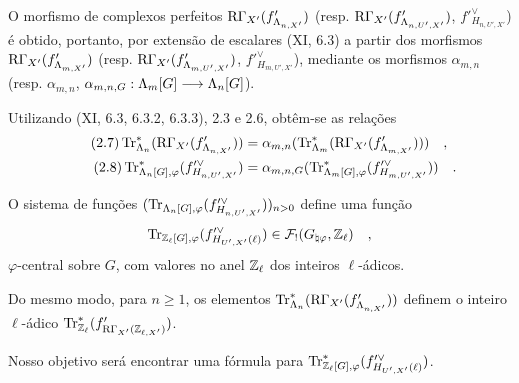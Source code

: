 O morfismo de complexos perfeitos $\mathrm{R}\Gamma_{X'}(f'_{\Lambda_{n,X'}})$ (resp. $\mathrm{R}\Gamma_{X'}(f'_{\Lambda_{n,U',X'}})$, $f'^\vee_{H_{n,U',X'}}$) é obtido, portanto, por extensão de escalares (XI, 6.3) a partir dos morfismos $\mathrm{R}\Gamma_{X'}(f'_{\Lambda_{m,X'}})$ (resp. $\mathrm{R}\Gamma_{X'}(f'_{\Lambda_{m,U',X'}})$, $f'^\vee_{H_{m,U',X'}}$), mediante os morfismos $\alpha_{m,n}$ (resp. $\alpha_{m,n}$, $\alpha_{m,n,G} : \Lambda_m[G] \longrightarrow \Lambda_n[G]$).

Utilizando (XI, 6.3, 6.3.2, 6.3.3), 2.3 e 2.6, obtêm-se as relações
\begin{align}
\tag{2.7} \operatorname{Tr}^*_{\Lambda_n}(\mathrm{R}\Gamma_{X'}(f'_{\Lambda_{n,X'}})) &= \alpha_{m,n}(\operatorname{Tr}^*_{\Lambda_m}(\mathrm{R}\Gamma_{X'}(f'_{\Lambda_{m,X'}}))) \quad , \\
\tag{2.8} \operatorname{Tr}^*_{\Lambda_n[G],\varphi}(f'^\vee_{H_{n,U',X'}}) &= \alpha_{m,n,G}(\operatorname{Tr}^*_{\Lambda_m[G],\varphi}(f'^\vee_{H_{m,U',X'}})) \quad .
\end{align}

O sistema de funções $(\operatorname{Tr}_{\Lambda_n[G],\varphi}(f'^\vee_{H_{n,U',X'}}))_{n>0}$ define uma função
\[
\operatorname{Tr}_{\mathbb Z_\ell[G],\varphi}(f'^\vee_{H_{U',X'}(\ell)}) \in \mathcal{F}_!(G_{\natural\varphi}, \mathbb Z_\ell) \quad ,
\]
$\varphi$-central sobre $G$, com valores no anel $\mathbb Z_\ell$ dos inteiros $\ell$-ádicos.

Do mesmo modo, para $n \geq 1$, os elementos $\operatorname{Tr}^*_{\Lambda_n}(\mathrm{R}\Gamma_{X'}(f'_{\Lambda_{n,X'}}))$ definem o inteiro $\ell$-ádico $\operatorname{Tr}^*_{\mathbb Z_\ell}(f'_{\mathrm{R}\Gamma_{X'}(\mathbb Z_{\ell,X'})})$.

Nosso objetivo será encontrar uma fórmula para $\operatorname{Tr}^*_{\mathbb Z_\ell[G],\varphi}(f'^\vee_{H_{U',X'}(\ell)})$.
